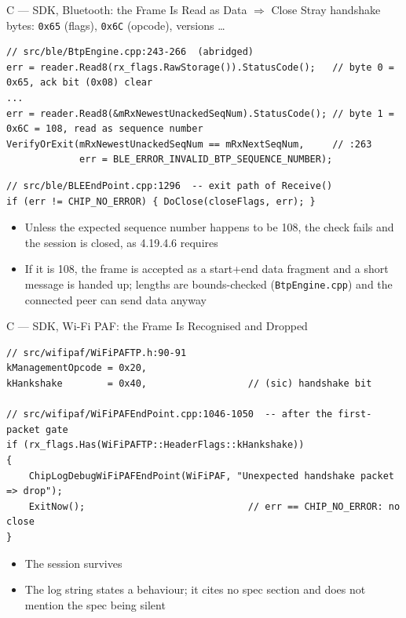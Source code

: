 \documentclass[10pt,aspectratio=169,t]{beamer}
\begin{document}
\begin{frame}[fragile]{C --- SDK, Bluetooth: the Frame Is Read as Data $\Rightarrow$ Close}
Stray handshake bytes: \texttt{0x65} (flags), \texttt{0x6C} (opcode), versions \ldots
\begin{lstlisting}[style=cppsmall]
// src/ble/BtpEngine.cpp:243-266  (abridged)
err = reader.Read8(rx_flags.RawStorage()).StatusCode();   // byte 0 = 0x65, ack bit (0x08) clear
...
err = reader.Read8(&mRxNewestUnackedSeqNum).StatusCode(); // byte 1 = 0x6C = 108, read as sequence number
VerifyOrExit(mRxNewestUnackedSeqNum == mRxNextSeqNum,     // :263
             err = BLE_ERROR_INVALID_BTP_SEQUENCE_NUMBER);
\end{lstlisting}
\begin{lstlisting}[style=cppsmall]
// src/ble/BLEEndPoint.cpp:1296  -- exit path of Receive()
if (err != CHIP_NO_ERROR) { DoClose(closeFlags, err); }
\end{lstlisting}
\begin{itemize}\small
  \item Unless the expected sequence number happens to be 108, the check fails
        and the session is closed, as 4.19.4.6 requires
  \item If it is 108, the frame is accepted as a start+end data fragment and a
        short message is handed up; lengths are bounds-checked
        (\texttt{BtpEngine.cpp}) and the connected peer can send data anyway
\end{itemize}
\end{frame}

\begin{frame}[fragile]{C --- SDK, Wi-Fi PAF: the Frame Is Recognised and Dropped}
\begin{lstlisting}[style=cppsmall]
// src/wifipaf/WiFiPAFTP.h:90-91
kManagementOpcode = 0x20,
kHankshake        = 0x40,                  // (sic) handshake bit

// src/wifipaf/WiFiPAFEndPoint.cpp:1046-1050  -- after the first-packet gate
if (rx_flags.Has(WiFiPAFTP::HeaderFlags::kHankshake))
{
    ChipLogDebugWiFiPAFEndPoint(WiFiPAF, "Unexpected handshake packet => drop");
    ExitNow();                             // err == CHIP_NO_ERROR: no close
}
\end{lstlisting}
\begin{itemize}\small
  \item The session survives
  \item The log string states a behaviour; it cites no spec section and does
        not mention the spec being silent
\end{itemize}
\end{frame}
\end{document}

